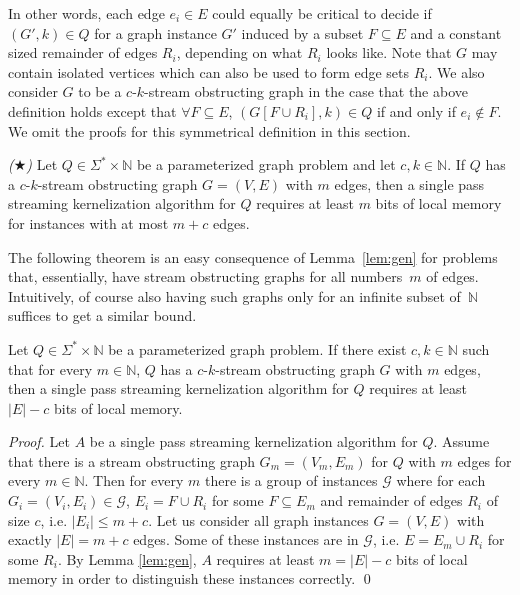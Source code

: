 \documentclass[draft,a4paper]{llncs}
\newcommand{\N}{\mathbb{N}}
\begin{document}
In other words, each edge $e_i \in E$ could equally be critical to decide if $(G',k) \in Q$ for a graph instance $G'$ induced by a subset $F \subseteq E$ and a constant sized remainder of edges $R_i$, depending on what $R_i$ looks like. Note that $G$ may contain isolated vertices which can also be used to form edge sets $R_i$. We also consider $G$ to be a $c$-$k$-stream obstructing graph in the case that the above definition holds except that $\forall F \subseteq E$, $(G[F\cup R_i], k) \in Q$ if and only if $e_i \notin F$. We omit the proofs for this symmetrical definition in this section.

\begin{lemma} \label{lem:gen} \emph{($\bigstar$)}
 Let $Q \in \Sigma^* \times \mathbb{N}$ be a parameterized graph problem and let $c, k \in \N$. If $Q$ has a $c$-$k$-stream obstructing graph $G=(V,E)$ with $m$ edges, then a single pass streaming kernelization algorithm for $Q$ requires at least $m$ bits of local memory for instances with at most $m+c$ edges.
\end{lemma}

The following theorem is an easy consequence of Lemma~\ref{lem:gen} for problems that, essentially, have stream obstructing graphs for all numbers~$m$ of edges. Intuitively, of course also having such graphs only for an infinite subset of~$\N$ suffices to get a similar bound.

\begin{theorem} \label{thm:gen}
 Let $Q \in \Sigma^* \times \mathbb{N}$ be a parameterized graph problem. If there exist $c, k \in \mathbb{N}$ such that for every $m \in \mathbb{N}$, $Q$ has a $c$-$k$-stream obstructing graph $G$ with $m$ edges, then a single pass streaming kernelization algorithm for $Q$ requires at least $|E| - c$ bits of local memory.
\end{theorem}

\begin{proof}
 Let $A$ be a single pass streaming kernelization algorithm for $Q$. Assume that there is a stream obstructing graph $G_m=(V_m,E_m)$ for $Q$ with $m$ edges for every $m \in \mathbb{N}$. Then for every $m$ there is a group of instances $\mathcal{G}$ where for each $G_i=(V_i, E_i) \in \mathcal{G}$, $E_i = F \cup R_i$ for some $F \subseteq E_m$ and remainder of edges $R_i$ of size $c$, i.e. $|E_i| \leq m + c$. Let us consider all graph instances $G=(V, E)$ with exactly $|E| = m + c$ edges. Some of these
 instances are in $\mathcal{G}$, i.e. $E = E_m \cup R_i$ for some $R_i$. By Lemma \ref{lem:gen}, $A$ requires at least $m = |E| - c$ bits of local memory in order to distinguish these instances correctly. \qed \end{proof}
 
\end{document}
